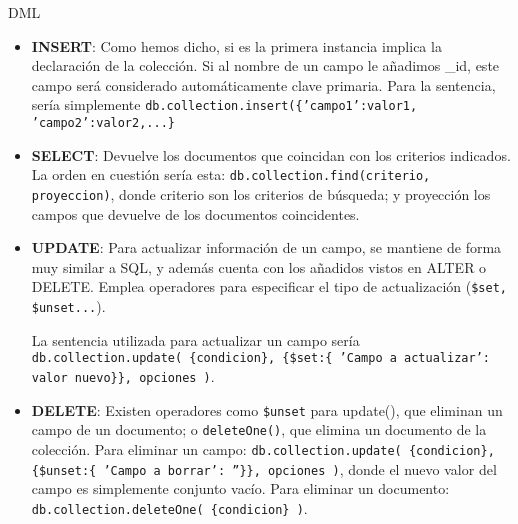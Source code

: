 \bigskip

\pagebreak
\bigskip
{\LARGE DML}

  \begin{itemize}
    \item \textbf{INSERT}: Como hemos dicho, si es la primera instancia implica la declaración de la colección. Si al nombre de un campo le añadimos \_id, este campo será considerado automáticamente clave primaria. Para la sentencia, sería simplemente \texttt{db.collection.insert(\{'campo1':valor1, 'campo2':valor2,...\}}

    \item \textbf{SELECT}: Devuelve los documentos que coincidan con los criterios indicados. La orden en cuestión sería esta: \texttt{db.collection.find(criterio, proyeccion)}, donde criterio son los criterios de búsqueda; y proyección los campos que devuelve de los documentos coincidentes.

    \item \textbf{UPDATE}: Para actualizar información de un campo, se mantiene de forma muy similar a SQL, y además cuenta con los añadidos vistos en ALTER o DELETE. Emplea operadores para especificar el tipo de actualización (\texttt{\$set, \$unset...}).

    La sentencia utilizada para actualizar un campo sería \texttt{db.collection.update( \{condicion\}, \{\$set:\{ 'Campo a actualizar': valor nuevo\}\}, opciones )}.

    \item \textbf{DELETE}: Existen operadores como \texttt{\$unset} para update(), que eliminan un campo de un documento; o \texttt{deleteOne()}, que elimina un documento de la colección.
    Para eliminar un campo: \texttt{db.collection.update( \{condicion\}, \{\$unset:\{ 'Campo a borrar': ''\}\}, opciones )}, donde el nuevo valor del campo es simplemente conjunto vacío.
    Para eliminar un documento: \texttt{db.collection.deleteOne( \{condicion\} )}.


  \end{itemize}
